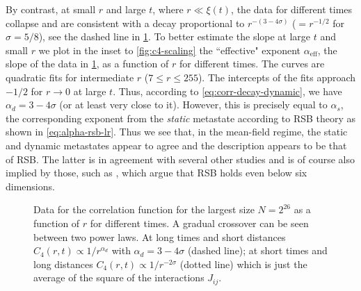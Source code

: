 By contrast, at small $r$ and large $t$, where $r \ll \xi(t)$, the data for
different times collapse and are consistent with a decay proportional to
$r^{-(3-4\sigma)}$ ($=r^{-1/2}$ for $\sigma=5/8$), see the dashed line in
\cref{fig:c4-vs-r-times}. To better estimate the slope at large $t$ and small
$r$ we plot in the inset to \cref{fig:c4-scaling} the ``effective" exponent
$\alpha_{\mathrm{eff}}$, the slope of the data in \cref{fig:c4-vs-r-times}, as
a function of $r$ for different times. The curves are quadratic fits for
intermediate $r$ ($7 \leq r \leq 255$). The intercepts of the fits approach
$-1/2$ for $r \to 0$ at large $t$. Thus, according to
\cref{eq:corr-decay-dynamic}, we have $\alpha_d=3-4\sigma$ (or at least very
close to it). However, this is precisely equal to $\alpha_s$, the corresponding
exponent from the \emph{static} metastate according to RSB theory as shown in
\cref{eq:alpha-rsb-lr}. Thus we see that, in the mean-field regime, the static
and dynamic metastates appear to agree and the description appears to be that
of RSB. The latter is in agreement with several other studies
\autocite{moore2011disappearance,katzgraber2005probing} and is of course also
implied by those, such as \textcite{banos2010nature,banos2010static}, which
argue that RSB holds even below six dimensions.
\begin{figure}
  \centering
  
  \caption[
    Data for the correlation function at different times of the 1-d long-range
    diluted spin glass with $\sigma=5/8$ at $T=0.4T_c$.
  ]
  {
    Data for the correlation function for the largest size $N=2^{26}$ as a
    function of $r$ for different times. A gradual crossover can be seen
    between two power laws. At long times and short distances $C_4(r,t) \propto
    1/r^{\alpha_d}$ with $\alpha_d = 3 - 4\sigma$ (dashed line); at short times
    and long distances $C_4(r,t) \propto 1/r^{-2\sigma}$ (dotted line) which is
    just the average of the square of the interactions $J_{ij}$.
  } \label{fig:c4-vs-r-times}
\end{figure}

